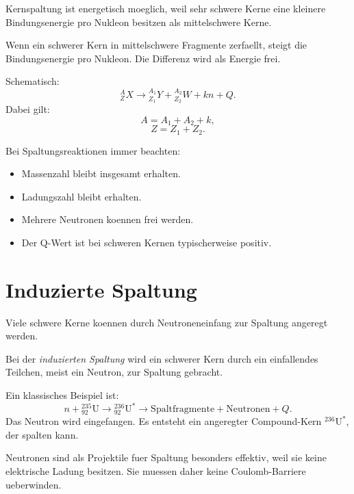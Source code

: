 \begin{conceptbox}
Kernspaltung ist energetisch moeglich, weil sehr schwere Kerne eine kleinere
Bindungsenergie pro Nukleon besitzen als mittelschwere Kerne.

Wenn ein schwerer Kern in mittelschwere Fragmente zerfaellt, steigt die
Bindungsenergie pro Nukleon.
Die Differenz wird als Energie frei.
\end{conceptbox}

\begin{formulabox}
Schematisch:
\[
    {}^{A}_{Z}X
    \rightarrow
    {}^{A_1}_{Z_1}Y
    +
    {}^{A_2}_{Z_2}W
    +
    k n
    +
    Q.
\]
Dabei gilt:
\[
    A=A_1+A_2+k,
\]
\[
    Z=Z_1+Z_2.
\]
\end{formulabox}

\begin{examtipbox}
Bei Spaltungsreaktionen immer beachten:
\begin{itemize}
    \item Massenzahl bleibt insgesamt erhalten.
    \item Ladungszahl bleibt erhalten.
    \item Mehrere Neutronen koennen frei werden.
    \item Der Q-Wert ist bei schweren Kernen typischerweise positiv.
\end{itemize}
\end{examtipbox}

\section{Induzierte Spaltung}

Viele schwere Kerne koennen durch Neutroneneinfang zur Spaltung angeregt werden.

\begin{definitionbox}
Bei der \emph{induzierten Spaltung} wird ein schwerer Kern durch ein einfallendes
Teilchen, meist ein Neutron, zur Spaltung gebracht.
\end{definitionbox}

\begin{examplebox}
Ein klassisches Beispiel ist:
\[
    n + {}^{235}_{92}\mathrm{U}
    \rightarrow
    {}^{236}_{92}\mathrm{U}^{*}
    \rightarrow
    \text{Spaltfragmente}
    + \text{Neutronen}
    + Q.
\]
Das Neutron wird eingefangen.
Es entsteht ein angeregter Compound-Kern ${}^{236}\mathrm{U}^{*}$, der spalten kann.
\end{examplebox}

\begin{conceptbox}
Neutronen sind als Projektile fuer Spaltung besonders effektiv, weil sie keine
elektrische Ladung besitzen.
Sie muessen daher keine Coulomb-Barriere ueberwinden.
\end{conceptbox}

